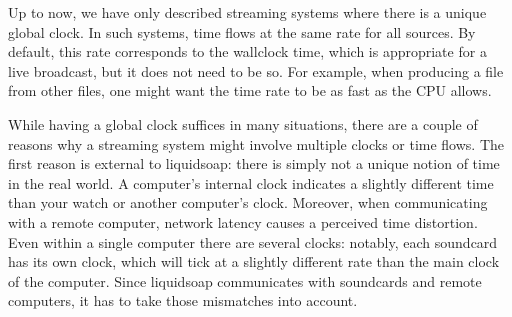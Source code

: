 

Up to now, we have only described streaming systems where there is
a unique global clock. In such systems, time flows at the same rate
for all sources.
By default, this rate corresponds to the wallclock time,
which is appropriate for a live broadcast,
but it does not need to be so.
For example, when producing a file from other files,
one might want the time rate to be as fast as the CPU allows.


While having a global clock suffices in many situations,
there are a couple of reasons why a streaming system might involve multiple
clocks or time flows.
The first reason is external to liquidsoap: there is simply
not a unique notion of time in the real world.
A computer's internal clock indicates a slightly different time
than your watch or another computer's clock.
Moreover, when communicating with a remote computer, network
latency causes a perceived time distortion.
Even within a single computer there are several clocks: notably, each
soundcard has its own clock, which will tick at a slightly different
rate than the main clock of the computer.
Since liquidsoap communicates with soundcards and remote computers,
it has to take those mismatches into account.


